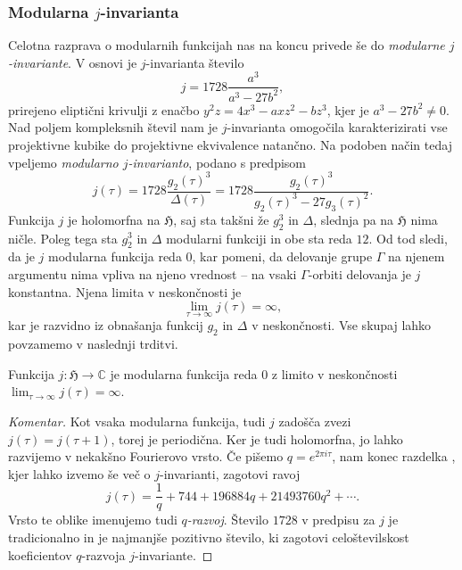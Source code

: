 \documentclass[mat1]{fmfdelo}
\numberwithin{equation}{section}
\newcommand{\C}{\mathbb C}
\newcommand{\HH}{\mathfrak{H}}
\newcommand{\SL}{\Gamma}
\theoremstyle{definition}
\newenvironment{komentar}[1][Komentar]{\begin{proof}[#1]\let\qed\relax}{\end{proof}}
\begin{document}
\subsubsection*{Modularna $j$-invarianta} Celotna razprava o modularnih funkcijah nas na koncu privede še do \emph{modularne $j$-invariante}. V osnovi je $j$-invarianta število 
\[
    j = 1728\frac{a^3}{a^3 - 27b^2},
\]
prirejeno eliptični krivulji z enačbo $y^2z = 4x^3 - axz^2 - bz^3$, kjer je $a^3 - 27b^2 \neq 0$. Nad poljem kompleksnih števil nam je $j$-invarianta omogočila karakterizirati vse projektivne kubike do projektivne ekvivalence natančno. Na podoben način tedaj vpeljemo \emph{modularno $j$-invarianto}, podano s predpisom
\[
    j(\tau) = 1728\frac{g_2(\tau)^3}{\Delta(\tau)}
    = 1728\frac{g_2(\tau)^3}{g_2(\tau)^3 - 27g_3(\tau)^2}.
\]
Funkcija $j$ je holomorfna na $\HH$, saj sta takšni že $g_2^3$ in $\Delta$, slednja pa na $\HH$ nima ničle. Poleg tega sta $g_2^3$ in $\Delta$ modularni funkciji in obe sta reda $12$. Od tod sledi, da je $j$ modularna funkcija reda $0$, kar pomeni, da delovanje grupe $\SL$ na njenem argumentu nima vpliva na njeno vrednost -- na vsaki $\SL$-orbiti delovanja je $j$ konstantna. Njena limita v neskončnosti je 
\[
    \lim_{\tau \to \infty}j(\tau) = \infty,
\]
kar je razvidno iz obnašanja funkcij $g_2$ in $\Delta$ v neskončnosti. Vse skupaj lahko povzamemo v naslednji trditvi.

\begin{trditev}
    Funkcija $j : \HH \to \C$ je modularna funkcija reda $0$ z limito v neskončnosti $\lim_{\tau \to \infty}j(\tau) = \infty$.
\end{trditev}

\begin{komentar}
    Kot vsaka modularna funkcija, tudi $j$ zadošča zvezi $j(\tau) = j(\tau + 1)$, torej je periodična. Ker je tudi holomorfna, jo lahko razvijemo v nekakšno Fourierovo vrsto. Če pišemo $q = e^{2\pi i \tau}$, nam konec razdelka \cite[VII, \S3]{Serre}, kjer lahko izvemo še več o $j$-invarianti, zagotovi ravoj
    \[
        j(\tau) = \frac{1}{q} + 744 + 196884q + 21493760q^2 + \cdots.
    \]
    Vrsto te oblike imenujemo tudi \emph{$q$-razvoj}. Število $1728$ v predpisu za $j$ je tradicionalno in je najmanjše pozitivno število, ki zagotovi celoštevilskost koeficientov $q$-razvoja $j$-invariante. 
\end{komentar}

\end{document}
